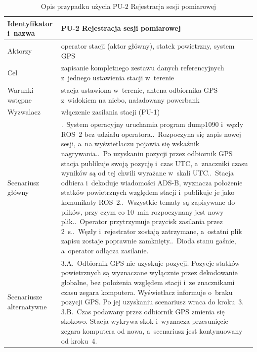 \begin{table}[!htb]
  \centering
  \caption{Opis przypadku użycia PU-2 Rejestracja sesji pomiarowej}
  \label{tab:pu_rejestracja}
  \small
  \begin{tabular}{>{\raggedright}p{3.0cm} >{\raggedright\arraybackslash}p{12.1cm}}
    \toprule
    Identyfikator i~nazwa & PU-2 Rejestracja sesji pomiarowej \\
    \midrule
    Aktorzy & operator stacji (aktor główny), statek powietrzny, system GPS \\
    \midrule
    Cel & zapisanie kompletnego zestawu danych referencyjnych z~jednego ustawienia stacji w~terenie \\
    \midrule
    Warunki wstępne & stacja ustawiona w~terenie, antena odbiornika GPS z~widokiem na niebo, naładowany powerbank \\
    \midrule
    Wyzwalacz & włączenie zasilania stacji (PU-1) \\
    \midrule
    Scenariusz główny &
    1.~System operacyjny uruchamia program dump1090 i~węzły ROS~2 bez udziału operatora.\newline
    2.~Rozpoczyna się zapis nowej sesji, a~na wyświetlaczu pojawia się wskaźnik nagrywania.\newline
    3.~Po uzyskaniu pozycji przez odbiornik GPS stacja publikuje swoją pozycję i~czas UTC, a~znaczniki czasu wyników są od tej chwili wyrażane w~skali UTC.\newline
    4.~Stacja odbiera i~dekoduje wiadomości ADS-B, wyznacza położenie statków powietrznych względem stacji i~publikuje je jako komunikaty ROS~2.\newline
    5.~Wszystkie tematy są zapisywane do plików, przy czym co \SI{10}{min} rozpoczynany jest nowy plik.\newline
    6.~Operator przytrzymuje przycisk zasilania przez \SI{2}{s}.\newline
    7.~Węzły i~rejestrator zostają zatrzymane, a~ostatni plik zapisu zostaje poprawnie zamknięty.\newline
    8.~Dioda stanu gaśnie, a~operator odłącza zasilanie. \\
    \midrule
    Scenariusze alternatywne &
    3.A.~Odbiornik GPS nie uzyskuje pozycji. Pozycje statków powietrznych są wyznaczane wyłącznie przez dekodowanie globalne, bez położenia względem stacji i~ze znacznikami czasu zegara komputera. Wyświetlacz informuje o~braku pozycji GPS. Po jej uzyskaniu scenariusz wraca do kroku~3.\newline
    3.B.~Czas podawany przez odbiornik GPS zmienia się skokowo. Stacja wykrywa skok i~wyznacza przesunięcie zegara komputera od nowa, a~scenariusz jest kontynuowany od kroku~4. \\

\end{tabular}
\end{table}
